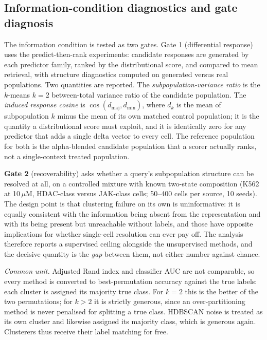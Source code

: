 \documentclass[11pt,letterpaper]{article}
\begin{document}
\subsection*{Information-condition diagnostics and gate diagnosis}

The information condition is tested as two gates. Gate 1 (differential response)
uses the predict-then-rank experiments: candidate responses are generated by each predictor
family, ranked by the distributional score, and compared to mean retrieval, with structure diagnostics computed
on generated versus real populations. Two quantities are reported. The
\emph{subpopulation-variance ratio} is the $k$-means $k{=}2$ between-total variance ratio of
the candidate population. The \emph{induced response cosine} is
$\cos(d_{\mathrm{maj}}, d_{\mathrm{min}})$, where $d_k$ is the mean of subpopulation $k$
minus the mean of its own matched control population; it is the quantity a distributional
score must exploit, and it is identically zero for any predictor that adds a single delta
vector to every cell. The reference population for both is the alpha-blended candidate
population that a scorer actually ranks, not a single-context treated population.

\textbf{Gate 2} (recoverability) asks whether a query's subpopulation structure can be resolved at
all, on a controlled mixture with known two-state composition (K562 at 10\,$\mu$M, HDAC-class
versus JAK-class cells; 50--400 cells per source, 10 seeds). The design point is that clustering
failure on its own is uninformative: it is equally consistent with the information being absent
from the representation and with its being present but unreachable without labels, and those have
opposite implications for whether single-cell resolution can ever pay off. The analysis therefore
reports a supervised ceiling alongside the unsupervised methods, and the decisive quantity
is the \emph{gap} between them, not either number against chance.

\emph{Common unit.} Adjusted Rand index and classifier AUC are not comparable, so every method is
converted to best-permutation accuracy against the true labels: each cluster is assigned its
majority true class. For $k = 2$ this is the better of the two permutations; for $k > 2$ it is
strictly generous, since an over-partitioning method is never penalised for splitting a true class.
HDBSCAN noise is treated as its own cluster and likewise assigned its majority class, which is
generous again. Clusterers thus receive their label matching for free.
\end{document}
